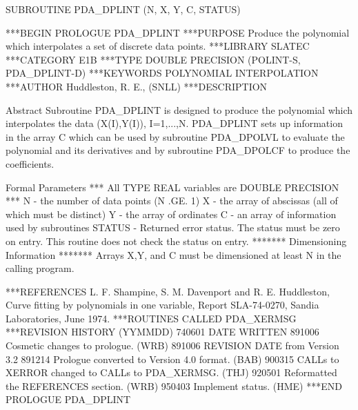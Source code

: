 \documentclass[11pt,twoside,nolof]{starlink}
\begin{document}
\begin{terminalv}
      SUBROUTINE PDA_DPLINT (N, X, Y, C, STATUS)


***BEGIN PROLOGUE  PDA_DPLINT
***PURPOSE  Produce the polynomial which interpolates a set of discrete
            data points.
***LIBRARY   SLATEC
***CATEGORY  E1B
***TYPE      DOUBLE PRECISION (POLINT-S, PDA_DPLINT-D)
***KEYWORDS  POLYNOMIAL INTERPOLATION
***AUTHOR  Huddleston, R. E., (SNLL)
***DESCRIPTION

     Abstract
        Subroutine PDA_DPLINT is designed to produce the polynomial which
     interpolates the data  (X(I),Y(I)), I=1,...,N.  PDA_DPLINT sets up
     information in the array C which can be used by subroutine PDA_DPOLVL
     to evaluate the polynomial and its derivatives and by subroutine
     PDA_DPOLCF to produce the coefficients.

     Formal Parameters
     *** All TYPE REAL variables are DOUBLE PRECISION ***
     N  - the number of data points  (N .GE. 1)
     X  - the array of abscissas (all of which must be distinct)
     Y  - the array of ordinates
     C  - an array of information used by subroutines
     STATUS  - Returned error status.
               The status must be zero on entry. This
               routine does not check the status on entry.
     *******  Dimensioning Information  *******
     Arrays X,Y, and C must be dimensioned at least N in the calling
     program.

***REFERENCES  L. F. Shampine, S. M. Davenport and R. E. Huddleston,
                 Curve fitting by polynomials in one variable, Report
                 SLA-74-0270, Sandia Laboratories, June 1974.
***ROUTINES CALLED  PDA_XERMSG
***REVISION HISTORY  (YYMMDD)
   740601  DATE WRITTEN
   891006  Cosmetic changes to prologue.  (WRB)
   891006  REVISION DATE from Version 3.2
   891214  Prologue converted to Version 4.0 format.  (BAB)
   900315  CALLs to XERROR changed to CALLs to PDA_XERMSG.  (THJ)
   920501  Reformatted the REFERENCES section.  (WRB)
   950403  Implement status.  (HME)
***END PROLOGUE  PDA_DPLINT
\end{terminalv}


\newpage %
\end{document}
